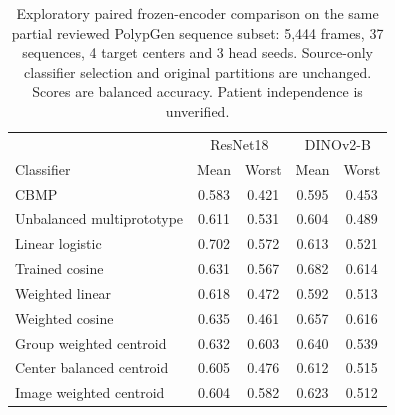 \begin{table}[t]
\centering\small
\begin{tabular}{lcccc}
\hline
& \multicolumn{2}{c}{ResNet18} & \multicolumn{2}{c}{DINOv2-B} \\
Classifier & Mean & Worst & Mean & Worst \\
\hline
CBMP & 0.583 & 0.421 & 0.595 & 0.453 \\
Unbalanced multiprototype & 0.611 & 0.531 & 0.604 & 0.489 \\
Linear logistic & 0.702 & 0.572 & 0.613 & 0.521 \\
Trained cosine & 0.631 & 0.567 & 0.682 & 0.614 \\
Weighted linear & 0.618 & 0.472 & 0.592 & 0.513 \\
Weighted cosine & 0.635 & 0.461 & 0.657 & 0.616 \\
Group weighted centroid & 0.632 & 0.603 & 0.640 & 0.539 \\
Center balanced centroid & 0.605 & 0.476 & 0.612 & 0.515 \\
Image weighted centroid & 0.604 & 0.582 & 0.623 & 0.512 \\
\hline\end{tabular}
\caption{Exploratory paired frozen-encoder comparison on the same partial reviewed PolypGen sequence subset: 5,444 frames, 37 sequences, 4 target centers and 3 head seeds. Source-only classifier selection and original partitions are unchanged. Scores are balanced accuracy. Patient independence is unverified.}
\label{tab:encoder_replication}
\end{table}
